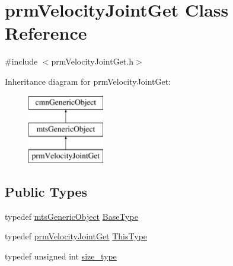 \hypertarget{classprm_velocity_joint_get}{}\section{prm\+Velocity\+Joint\+Get Class Reference}
\label{classprm_velocity_joint_get}


{\ttfamily \#include $<$prm\+Velocity\+Joint\+Get.\+h$>$}

Inheritance diagram for prm\+Velocity\+Joint\+Get\+:\begin{figure}[H]
\begin{center}
\leavevmode
\includegraphics[height=3.000000cm]{de/d7a/classprm_velocity_joint_get}
\end{center}
\end{figure}
\subsection*{Public Types}
\begin{DoxyCompactItemize}
\item 
typedef \hyperlink{classmts_generic_object}{mts\+Generic\+Object} \hyperlink{classprm_velocity_joint_get_ad043b0f13500d770bef8eca12241e581}{Base\+Type}
\item 
typedef \hyperlink{classprm_velocity_joint_get}{prm\+Velocity\+Joint\+Get} \hyperlink{classprm_velocity_joint_get_a97c1b10ad949296590e6106c69e94d02}{This\+Type}
\item 
typedef unsigned int \hyperlink{classprm_velocity_joint_get_af8a1c509111e5ac2e38dfe32bc6d9914}{size\+\_\+type}
\end{DoxyCompactItemize}
